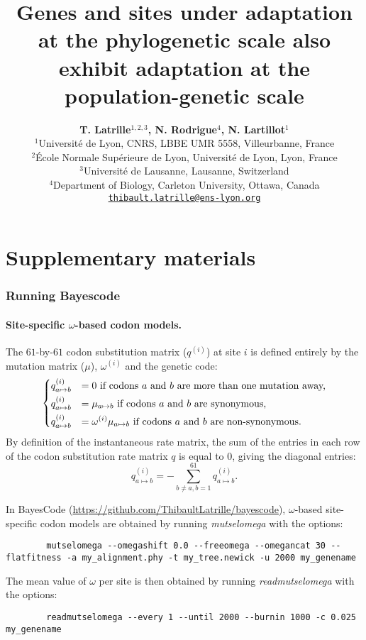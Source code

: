 \documentclass{article}
\title{Genes and sites under adaptation at the phylogenetic scale also exhibit adaptation at the population-genetic scale}
\author{
    \large
    \textbf{T. {Latrille}$^{1,2,3}$, N. {Rodrigue}$^{4}$, N. {Lartillot}$^{1}$}\\
    \footnotesize $^{1}$Université de Lyon, CNRS, LBBE UMR 5558, Villeurbanne, France\\
    \footnotesize $^{2}$École Normale Supérieure de Lyon, Université de Lyon, Lyon, France\\
    \footnotesize $^{3}$Université de Lausanne, Lausanne, Switzerland\\
    \footnotesize $^{4}$Department of Biology, Carleton University, Ottawa, Canada \\
    \footnotesize \texttt{\href{mailto:thibault.latrille@ens-lyon.org}{thibault.latrille@ens-lyon.org}} \\
}
\date{}
\renewcommand*{\bm}[1]{#1}%
\newcommand{\UniDimArray}[1]{\bm{#1}}
\begin{document}
    \maketitle
    \part*{Supplementary materials}
    \tableofcontents
    \pagebreak


    \section{Running Bayescode}

    \subsection{Site-specific $\omega$-based codon models.}
    The $61$-by-$61$ codon substitution matrix ($\UniDimArray{q^{(i)}}$) at site $i$ is defined entirely by the mutation matrix ($\UniDimArray{\mu}$), $\omega^{(i)}$ and the genetic code:
    \begin{equation}
        \begin{dcases}
            q_{a \mapsto b}^{(i)} & = 0 \text{ if codons $a$ and $b$ are more than one mutation away,} \\
            q_{a \mapsto b}^{(i)} & = \mu_{a \mapsto b} \text{ if codons $a$ and $b$ are synonymous,} \\
            q_{a \mapsto b}^{(i)} & = \omega^{(i)} \mu_{a \mapsto b} \text{ if codons $a$ and $b$ are non-synonymous}.
        \end{dcases}
    \end{equation}
    By definition of the instantaneous rate matrix, the sum of the entries in each row of the codon substitution rate matrix $\UniDimArray{q}$ is equal to $0$, giving the diagonal entries:
    \begin{equation}
        q_{a \mapsto b}^{(i)}= - \sum\limits_{b \neq a, b = 1}^{61} q_{a \mapsto b}^{(i)}.
    \end{equation}

    In BayesCode (\url{https://github.com/ThibaultLatrille/bayescode}), $\omega$-based site-specific codon models are obtained by running \textit{mutselomega} with the options:
    \begin{scriptsize}
        \begin{verbatim}
        mutselomega --omegashift 0.0 --freeomega --omegancat 30 --flatfitness -a my_alignment.phy -t my_tree.newick -u 2000 my_genename
        \end{verbatim}
    \end{scriptsize}
    The mean value of $\omega$ per site is then obtained by running \textit{readmutselomega} with the options:
    \begin{scriptsize}
        \begin{verbatim}
        readmutselomega --every 1 --until 2000 --burnin 1000 -c 0.025 my_genename
        \end{verbatim}
    \end{scriptsize}
\end{document}
